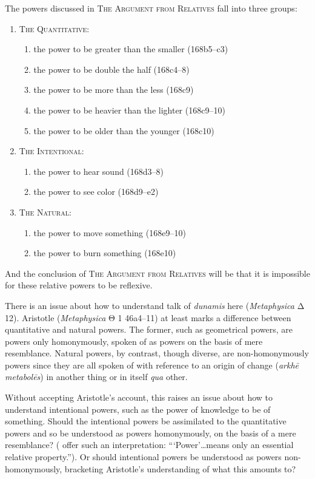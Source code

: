 The powers discussed in \textsc{The Argument from Relatives} fall into three groups:
\begin{enumerate}[(1)]
	\item \textsc{The Quantitative}:
	\begin{enumerate}
		\item the power to be greater than the smaller (168b5–c3)
		\item the power to be double the half (168c4–8)
		\item the power to be more than the less (168c9)
		\item the power to be heavier than the lighter (168c9–10)
		\item the power to be older than the younger (168c10)
	\end{enumerate}
	\item \textsc{The Intentional}:
	\begin{enumerate}
		\item the power to hear sound (168d3–8)
		\item the power to see color (168d9–e2)
	\end{enumerate}
	\item \textsc{The Natural}:
	\begin{enumerate}
		\item the power to move something (168e9–10)
		\item the power to burn something (168e10)
	\end{enumerate}
\end{enumerate}
And the conclusion of \textsc{The Argument from Relatives} will be that it is impossible for these relative powers to be reflexive.

There is an issue about how to understand talk of \emph{dunamis} here (\emph{Metaphysica} {\sbl Δ} 12). Aristotle (\emph{Metaphysica} {\sbl Θ} 1 46a4–11) at least marks a difference between quantitative and natural powers. The former, such as geometrical powers, are powers only homonymously, spoken of as powers on the basis of mere resemblance. Natural powers, by contrast, though diverse, are non-homonymously powers since they are all spoken of with reference to an origin of change (\emph{arkhē metabolēs}) in another thing or in itself \emph{qua} other. 

Without accepting Aristotle's account, this raises an issue about how to understand intentional powers, such as the power of knowledge to be of something. Should the intentional powers be assimilated to the quantitative powers and so be understood as powers homonymously, on the basis of a mere resemblance? (\citealt[24 n74]{Moore:2019aa} offer such an interpretation: ```Power'\ldots means only an essential relative property.''). Or should intentional powers be understood as powers non-homonymously, bracketing Aristotle's understanding of what this amounts to? 

